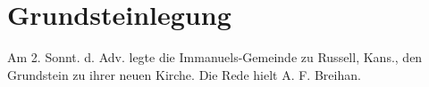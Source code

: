 \chapter[Grundsteinlegung]{Grundsteinlegung}
Am 2. Sonnt. d. Adv. legte die Immanuels-Gemeinde zu Russell, Kans., den Grundstein zu ihrer neuen Kirche. Die Rede hielt A. F. Breihan.
